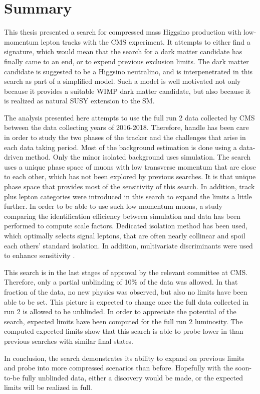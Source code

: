 \chapter{Summary}

This thesis presented a search for compressed mass Higgsino production with low-momentum lepton tracks with the CMS experiment. It attempts to either find a signature, which would mean that the search for a dark matter candidate has finally came to an end, or to expend previous exclusion limits. The dark matter candidate is suggested to be a Higgsino neutralino, and is interpenetrated in this search as part of a simplified model. Such a model is well motivated not only because it provides a suitable WIMP dark matter candidate, but also because it is realized as natural SUSY extension to the SM.

The analysis presented here attempts to use the full run 2 data collected by CMS between the data collecting years of 2016-2018. Therefore, handle has been care in order to study the two phases of the tracker and the challenges that arise in each data taking period. Most of the background estimation is done using a data-driven method. Only the minor isolated background uses simulation. The search uses a unique phase space of muons with low transverse momentum that are close to each other, which has not been explored by previous searches. It is that unique phase space that provides most of the sensitivity of this search. In addition,  track plus lepton categories were introduced in this search to expand the limits a little further. In order to be able to use such low momentum muons, a study comparing the identification efficiency between simulation and data has been performed to compute scale factors. Dedicated isolation method has been used, which optimally selects signal leptons, that are often nearly collinear and spoil each others' standard isolation. In addition, multivariate discriminants were used to enhance sensitivity .

This search is in the last stages of approval by the relevant committee at CMS. Therefore, only a partial unblinding of 10\% of the data was allowed. In that fraction of the data, no new physics was observed, but also no limits have been able to be set. This picture is expected to change once the full data collected in run 2 is allowed to be unblinded. In order to appreciate the potential of the search, expected limits have been computed for the full run 2 luminosity. The computed expected limits show that this search is able to probe lower in \dm than previous searches with similar final states.

In conclusion, the search demonstrates its ability to expand on previous limits and probe into more compressed scenarios than before. Hopefully with the soon-to-be fully unblinded data, either a discovery would be made, or the expected limits will be realized in full.